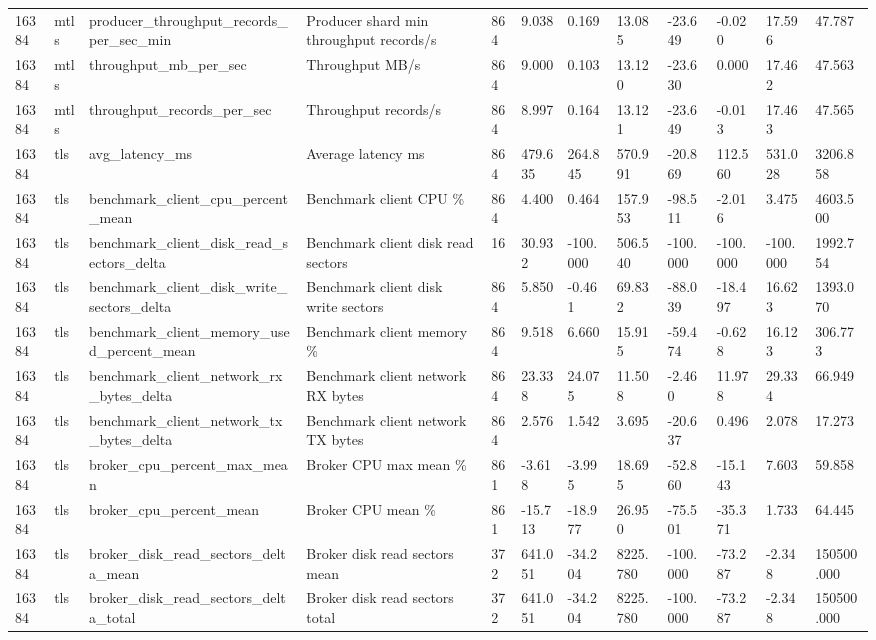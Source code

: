 \begin{longtable}{llllllllllll}
16384 & mtls & producer\_throughput\_records\_per\_sec\_min & Producer shard min throughput records/s & 864 & 9.038 & 0.169 & 13.085 & -23.649 & -0.020 & 17.596 & 47.787 \\
16384 & mtls & throughput\_mb\_per\_sec & Throughput MB/s & 864 & 9.000 & 0.103 & 13.120 & -23.630 & 0.000 & 17.462 & 47.563 \\
16384 & mtls & throughput\_records\_per\_sec & Throughput records/s & 864 & 8.997 & 0.164 & 13.121 & -23.649 & -0.013 & 17.463 & 47.565 \\
16384 & tls & avg\_latency\_ms & Average latency ms & 864 & 479.635 & 264.845 & 570.991 & -20.869 & 112.560 & 531.028 & 3206.858 \\
16384 & tls & benchmark\_client\_cpu\_percent\_mean & Benchmark client CPU \% & 864 & 4.400 & 0.464 & 157.953 & -98.511 & -2.016 & 3.475 & 4603.500 \\
16384 & tls & benchmark\_client\_disk\_read\_sectors\_delta & Benchmark client disk read sectors & 16 & 30.932 & -100.000 & 506.540 & -100.000 & -100.000 & -100.000 & 1992.754 \\
16384 & tls & benchmark\_client\_disk\_write\_sectors\_delta & Benchmark client disk write sectors & 864 & 5.850 & -0.461 & 69.832 & -88.039 & -18.497 & 16.623 & 1393.070 \\
16384 & tls & benchmark\_client\_memory\_used\_percent\_mean & Benchmark client memory \% & 864 & 9.518 & 6.660 & 15.915 & -59.474 & -0.628 & 16.123 & 306.773 \\
16384 & tls & benchmark\_client\_network\_rx\_bytes\_delta & Benchmark client network RX bytes & 864 & 23.338 & 24.075 & 11.508 & -2.460 & 11.978 & 29.334 & 66.949 \\
16384 & tls & benchmark\_client\_network\_tx\_bytes\_delta & Benchmark client network TX bytes & 864 & 2.576 & 1.542 & 3.695 & -20.637 & 0.496 & 2.078 & 17.273 \\
16384 & tls & broker\_cpu\_percent\_max\_mean & Broker CPU max mean \% & 861 & -3.618 & -3.995 & 18.695 & -52.860 & -15.143 & 7.603 & 59.858 \\
16384 & tls & broker\_cpu\_percent\_mean & Broker CPU mean \% & 861 & -15.713 & -18.977 & 26.950 & -75.501 & -35.371 & 1.733 & 64.445 \\
16384 & tls & broker\_disk\_read\_sectors\_delta\_mean & Broker disk read sectors mean & 372 & 641.051 & -34.204 & 8225.780 & -100.000 & -73.287 & -2.348 & 150500.000 \\
16384 & tls & broker\_disk\_read\_sectors\_delta\_total & Broker disk read sectors total & 372 & 641.051 & -34.204 & 8225.780 & -100.000 & -73.287 & -2.348 & 150500.000 \\

\end{longtable}
